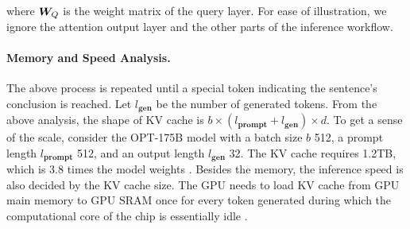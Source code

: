 where ${\bm{W}}_Q$ is the weight matrix of the query layer. 
For ease of illustration, we ignore the attention output layer and the other parts of the inference workflow.

\paragraph{Memory and Speed Analysis.}
The above process is repeated until a special token indicating the sentence's conclusion is reached.
Let $l_{\textbf{gen}}$ be the number of generated tokens.
From the above analysis, the shape of KV cache is $b\times (l_{\textbf{prompt}}+l_{\textbf{gen}})\times d$.
To get a sense of the scale, consider the OPT-175B model with a batch size $b$ 512, a prompt length $l_{\textbf{prompt}}$ 512, and an output length $l_{\textbf{gen}}$ 32. The KV cache requires 1.2TB, which is 3.8 times the model weights \citep{flexgen}. 
Besides the memory, the inference speed is also decided by the KV cache size.
The GPU needs to load KV cache from GPU main memory to GPU SRAM once for every token generated during which the computational core of the chip is essentially idle \citep{pope2023efficiently, vllm}.